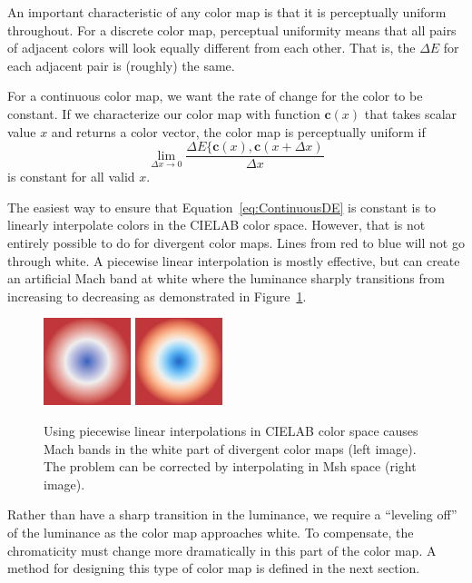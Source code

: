 \documentclass[twocolumn]{article}
\newcommand{\Lab}{CIELAB\xspace}
\newcommand{\Msh}{Msh\xspace}
\newcommand{\DeltaE}{\ensuremath{\Delta{}E}\xspace}
\newcommand*{\cvec}[1]{\mathbf{#1}}
\begin{document}
An important characteristic of any color map is that it is perceptually
uniform throughout.  For a discrete color map, perceptual uniformity means
that all pairs of adjacent colors will look equally different from each
other.  That is, the \DeltaE for each adjacent pair is (roughly) the same.

For a continuous color map, we want the rate of change for the color to be
constant.  If we characterize our color map with function $\cvec{c}(x)$
that takes scalar value $x$ and returns a color vector, the color map is
perceptually uniform if
\begin{equation}
  \lim_{\Delta{}x \rightarrow 0}{
    \frac{\DeltaE\{\cvec{c}(x),\cvec{c}(x+\Delta{x})}{\Delta{}x} }
  \label{eq:ContinuousDE}
\end{equation}
is constant for all valid $x$.

The easiest way to ensure that Equation~\ref{eq:ContinuousDE} is constant
is to linearly interpolate colors in the \Lab color space.  However, that
is not entirely possible to do for divergent color maps.  Lines from red to
blue will not go through white.  A piecewise linear interpolation is mostly
effective, but can create an artificial Mach band at white where the
luminance sharply transitions from increasing to decreasing as demonstrated
in Figure~\ref{fig:LinearMachBands}.

\begin{figure}
  \centering
  \includegraphics[width=1in]{images/Cool2WarmLabRadial}
  \qquad
  \includegraphics[width=1in]{images/Cool2WarmRadial}
  \caption{Using piecewise linear interpolations in \Lab color space causes
    Mach bands in the white part of divergent color maps (left image).  The
    problem can be corrected by interpolating in \Msh space (right image).}
  \label{fig:LinearMachBands}
\end{figure}

Rather than have a sharp transition in the luminance, we require a
``leveling off'' of the luminance as the color map approaches white.  To
compensate, the chromaticity must change more dramatically in this part of
the color map.  A method for designing this type of color map is defined in
the next section.
\end{document}
